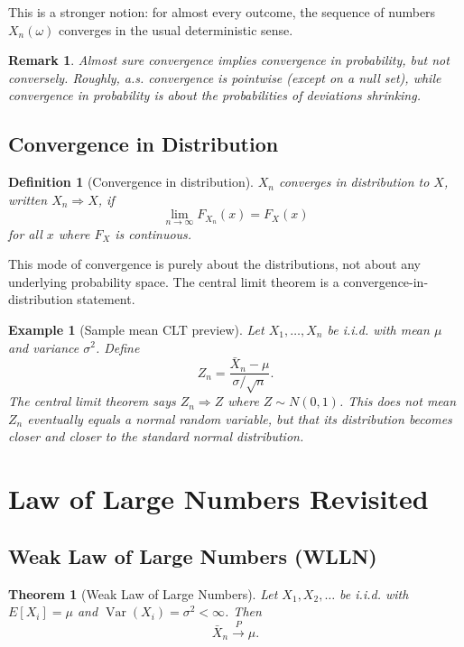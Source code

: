 \documentclass[11pt,a4paper]{article}
\newtheorem{definition}{Definition}[section]
\newtheorem{theorem}{Theorem}[section]
\newtheorem{example}{Example}[section]
\newtheorem{remark}{Remark}[section]
\begin{document}
This is a stronger notion: for almost every outcome, the sequence of numbers $X_n(\omega)$ converges in the usual deterministic sense.

\begin{remark}
Almost sure convergence implies convergence in probability, but not conversely. 
Roughly, a.s. convergence is pointwise (except on a null set), while convergence in probability is about the probabilities of deviations shrinking.
\end{remark}

\subsection{Convergence in Distribution}

\begin{definition}[Convergence in distribution]
$X_n$ converges in distribution to $X$, written $X_n \Rightarrow X$, if
\[
\lim_{n\to\infty} F_{X_n}(x) = F_X(x)
\]
for all $x$ where $F_X$ is continuous.
\end{definition}

This mode of convergence is purely about the distributions, not about any underlying probability space. 
The central limit theorem is a convergence-in-distribution statement.

\begin{example}[Sample mean CLT preview]
Let $X_1,\dots,X_n$ be i.i.d. with mean $\mu$ and variance $\sigma^2$. 
Define
\[
Z_n = \frac{\bar{X}_n - \mu}{\sigma/\sqrt{n}}.
\]
The central limit theorem says $Z_n \Rightarrow Z$ where $Z \sim N(0,1)$. 
This does not mean $Z_n$ eventually equals a normal random variable, but that its distribution becomes closer and closer to the standard normal distribution.

\end{example}

\newpage

\section{Law of Large Numbers Revisited}

\subsection{Weak Law of Large Numbers (WLLN)}

\begin{theorem}[Weak Law of Large Numbers]
Let $X_1, X_2, \dots$ be i.i.d. with $E[X_i] = \mu$ and $\operatorname{Var}(X_i) = \sigma^2 < \infty$. 
Then
\[
\bar{X}_n \xrightarrow{P} \mu.
\]
\end{theorem}
\end{document}
